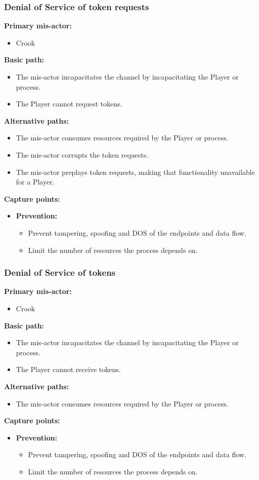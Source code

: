 \documentclass[a4paper,11pt]{report}
\begin{document}
\subsubsection{Denial of Service of token requests}
\textbf{Primary mis-actor:}
\begin{itemize}
\item Crook
\end{itemize}
\textbf{Basic path:}
\begin{itemize}
\item The mis-actor incapacitates the channel by incapacitating the Player or process.
\item The Player cannot request tokens.
\end{itemize}
\textbf{Alternative paths:}
\begin{itemize}
\item The mis-actor consumes resources required by the Player or process.
\item The mis-actor corrupts the token requests.
\item The mis-actor preplays token requests, making that functionality unavailable for a Player.
\end{itemize}
\textbf{Capture points:}
\begin{itemize}
\item \textbf{Prevention:}
\begin{itemize}
\item Prevent tampering, spoofing and DOS of the endpoints and data flow.
\item Limit the number of resources the process depends on.
\end{itemize}
\end{itemize}

\subsubsection{Denial of Service of tokens}
\textbf{Primary mis-actor:}
\begin{itemize}
\item Crook
\end{itemize}
\textbf{Basic path:}
\begin{itemize}
\item The mis-actor incapacitates the channel by incapacitating the Player or process.
\item The Player cannot receive tokens.
\end{itemize}
\textbf{Alternative paths:}
\begin{itemize}
\item The mis-actor consumes resources required by the Player or process.
\end{itemize}
\textbf{Capture points:}
\begin{itemize}
\item \textbf{Prevention:}
\begin{itemize}
\item Prevent tampering, spoofing and DOS of the endpoints and data flow.
\item Limit the number of resources the process depends on.
\end{itemize}
\end{itemize}
\end{document}
